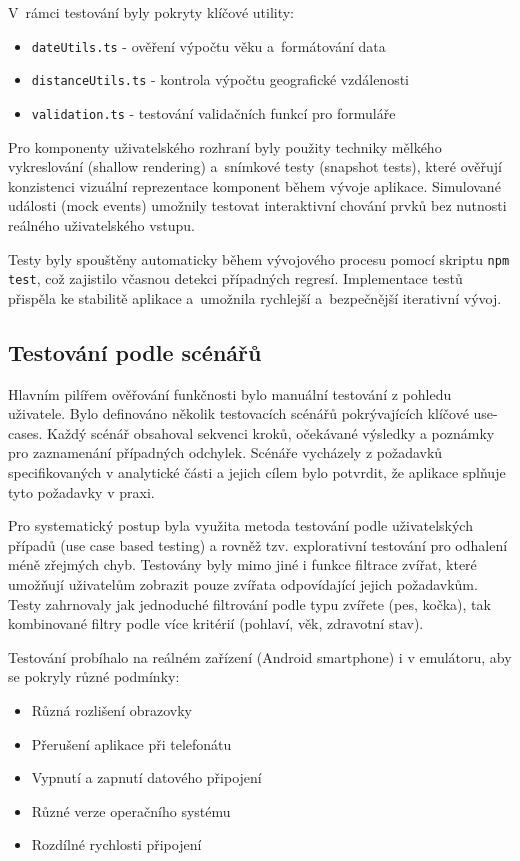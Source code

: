 \documentclass[czech, bp, kiv, he, iso690numb, pdf]{fasthesis}
\begin{document}
    V~rámci testování byly pokryty klíčové utility:
    \begin{itemize}
        \item \texttt{dateUtils.ts} - ověření výpočtu věku a~formátování data
        \item \texttt{distanceUtils.ts} - kontrola výpočtu geografické vzdálenosti
        \item \texttt{validation.ts} - testování validačních funkcí pro formuláře
    \end{itemize}

    Pro komponenty uživatelského rozhraní byly použity techniky mělkého vykreslování (shallow rendering) a~snímkové testy (snapshot tests), které ověřují konzistenci vizuální reprezentace komponent během vývoje aplikace. Simulované události (mock events) umožnily testovat interaktivní chování prvků bez nutnosti reálného uživatelského vstupu.

    Testy byly spouštěny automaticky během vývojového procesu pomocí skriptu \texttt{npm test}, což zajistilo včasnou detekci případných regresí. Implementace testů přispěla ke stabilitě aplikace a~umožnila rychlejší a~bezpečnější iterativní vývoj.


    \subsection*{Testování podle scénářů}

    Hlavním pilířem ověřování funkčnosti bylo manuální testování z pohledu uživatele. Bylo definováno několik testovacích scénářů pokrývajících klíčové use-cases. Každý scénář obsahoval sekvenci kroků, očekávané výsledky a poznámky pro zaznamenání případných odchylek. Scénáře vycházely z požadavků specifikovaných v analytické části a jejich cílem bylo potvrdit, že aplikace splňuje tyto požadavky v praxi.

    Pro systematický postup byla využita metoda testování podle uživatelských případů (use case based testing) a rovněž tzv. explorativní testování pro odhalení méně zřejmých chyb. Testovány byly mimo jiné i funkce filtrace zvířat, které umožňují uživatelům zobrazit pouze zvířata odpovídající jejich požadavkům. Testy zahrnovaly jak jednoduché filtrování podle typu zvířete (pes, kočka), tak kombinované filtry podle více kritérií (pohlaví, věk, zdravotní stav).

    Testování probíhalo na reálném zařízení (Android smartphone) i v emulátoru, aby se pokryly různé podmínky:
    \begin{itemize}
        \item Různá rozlišení obrazovky
        \item Přerušení aplikace při telefonátu
        \item Vypnutí a zapnutí datového připojení
        \item Různé verze operačního systému
        \item Rozdílné rychlosti připojení
    \end{itemize}
\end{document}
